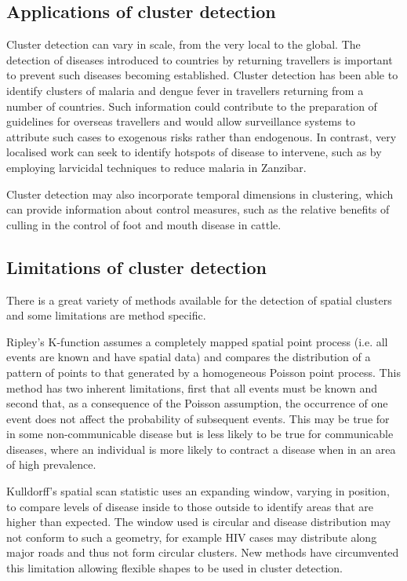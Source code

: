 \documentclass[a4paper,11pt]{article}
\begin{document}
\subsection{Applications of cluster detection}
Cluster detection can vary in scale, from the very local to the global.
The detection of diseases introduced to countries by returning travellers is important to prevent such diseases becoming established. 
Cluster detection has been able to identify clusters of malaria and dengue fever in travellers returning from a number of countries.\cite{Leder2013}
Such information could contribute to the preparation of guidelines for overseas travellers and would allow surveillance systems to attribute such cases to exogenous risks rather than endogenous. 
In contrast, very localised work can seek to identify hotspots of disease to intervene, such as by employing larvicidal techniques to reduce malaria in Zanzibar.\cite{Bousema2013}

Cluster detection may also incorporate temporal dimensions in clustering, which can provide information about control measures, such as the relative benefits of culling in the control of foot and mouth disease in cattle. \cite{Wilesmith2003}

\subsection{Limitations of cluster detection}
There is a great variety of methods available for the detection of spatial clusters and some limitations are method specific. 

Ripley's K-function assumes a completely mapped spatial point process (i.e. all events are known and have spatial data) and compares the distribution of a pattern of points to that generated by a homogeneous Poisson point process. \cite{Dixon2002} 
This method has two inherent limitations, first that all events must be known and second that, as a consequence of the Poisson assumption, the occurrence of one event does not affect the probability of subsequent events.
This may be true for in some non-communicable disease but is less likely to be true for communicable diseases, where an individual is more likely to contract a disease when in an area of high prevalence. \cite{Kirkwood2003}

Kulldorff's spatial scan statistic uses an expanding window, varying in position, to compare levels of disease inside to those outside to identify areas that are higher than expected.\cite{Kulldorff1995} 
The window used is circular and disease distribution may not conform to such a geometry, for example HIV cases may distribute along major roads and thus not form circular clusters.\cite{Tatem2012} 
New methods have circumvented this limitation allowing flexible shapes to be used in cluster detection. \cite{Tango2005}
\end{document}
